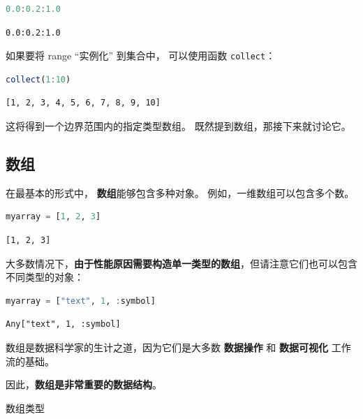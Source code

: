 \documentclass[
  notoc %
]{tufte-book}
\makeatletter
\newcommand{\passthrough}[1]{#1}
\renewcommand\subsubsection{%
\@startsection{subsubsection}{3}{\z@ }{-3.25ex\@plus -1ex \@minus -.2ex}{1.5ex \@plus .2ex}{\normalfont \normalsize \bfseries }
}
\makeatother
\begin{document}
\begin{lstlisting}[language=Julia]
0.0:0.2:1.0
\end{lstlisting}

\begin{lstlisting}[language=Output]
0.0:0.2:1.0
\end{lstlisting}

如果要将 range ``实例化'' 到集合中， 可以使用函数
\passthrough{\lstinline!collect!}：

\begin{lstlisting}[language=Julia]
collect(1:10)
\end{lstlisting}

\begin{lstlisting}[language=Output]
[1, 2, 3, 4, 5, 6, 7, 8, 9, 10]
\end{lstlisting}

这将得到一个边界范围内的指定类型数组。 既然提到数组，那接下来就讨论它。

\hypertarget{sec:array}{%
\subsection{数组}\label{sec:array}}

在最基本的形式中， \textbf{数组}能够包含多种对象。
例如，一维数组可以包含多个数。

\begin{lstlisting}[language=Julia]
myarray = [1, 2, 3]
\end{lstlisting}

\begin{lstlisting}[language=Output]
[1, 2, 3]
\end{lstlisting}

大多数情况下，\textbf{由于性能原因需要构造单一类型的数组}，但请注意它们也可以包含不同类型的对象：

\begin{lstlisting}[language=Julia]
myarray = ["text", 1, :symbol]
\end{lstlisting}

\begin{lstlisting}[language=Output]
Any["text", 1, :symbol]
\end{lstlisting}

数组是数据科学家的生计之道，因为它们是大多数 \textbf{数据操作} 和
\textbf{数据可视化} 工作流的基础。

因此，\textbf{数组是非常重要的数据结构}。

\hypertarget{sec:array_types}{%
\subsubsection{数组类型}\label{sec:array_types}}
\end{document}
